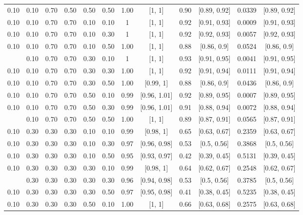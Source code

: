 \documentclass[
  11pt,
]{article}
\begin{document}
\begin{landscape}
\begin{ThreePartTable}
\begin{longtable}[t]{cccccccccccc}
0.10 & 0.10 & 0.70 & 0.50 & 0.50 & 0.50 & 1.00 & {}[1, 1] & 0.90 & {}[0.89, 0.92] & 0.0339 & {}[0.89, 0.92]\\
0.10 & 0.10 & 0.70 & 0.70 & 0.10 & 0.10 & 1 & {}[1, 1] & 0.92 & {}[0.91, 0.93] & 0.0009 & {}[0.91, 0.93]\\
0.10 & 0.10 & 0.70 & 0.70 & 0.10 & 0.30 & 1 & {}[1, 1] & 0.92 & {}[0.92, 0.93] & 0.0057 & {}[0.92, 0.93]\\
0.10 & 0.10 & 0.70 & 0.70 & 0.10 & 0.50 & 1.00 & {}[1, 1] & 0.88 & {}[0.86, 0.9] & 0.0524 & {}[0.86, 0.9]\\
\addlinespace
0.10 & 0.10 & 0.70 & 0.70 & 0.30 & 0.10 & 1 & {}[1, 1] & 0.93 & {}[0.91, 0.95] & 0.0041 & {}[0.91, 0.95]\\
0.10 & 0.10 & 0.70 & 0.70 & 0.30 & 0.30 & 1.00 & {}[1, 1] & 0.92 & {}[0.91, 0.94] & 0.0111 & {}[0.91, 0.94]\\
0.10 & 0.10 & 0.70 & 0.70 & 0.30 & 0.50 & 1.00 & {}[0.99, 1] & 0.88 & {}[0.86, 0.9] & 0.0436 & {}[0.86, 0.9]\\
0.10 & 0.10 & 0.70 & 0.70 & 0.50 & 0.10 & 0.99 & {}[0.96, 1.01] & 0.92 & {}[0.89, 0.95] & 0.0007 & {}[0.89, 0.95]\\
0.10 & 0.10 & 0.70 & 0.70 & 0.50 & 0.30 & 0.99 & {}[0.96, 1.01] & 0.91 & {}[0.88, 0.94] & 0.0072 & {}[0.88, 0.94]\\
\addlinespace
0.10 & 0.10 & 0.70 & 0.70 & 0.50 & 0.50 & 1.00 & {}[1, 1] & 0.89 & {}[0.87, 0.91] & 0.0565 & {}[0.87, 0.91]\\
0.10 & 0.30 & 0.30 & 0.30 & 0.10 & 0.10 & 0.99 & {}[0.98, 1] & 0.65 & {}[0.63, 0.67] & 0.2359 & {}[0.63, 0.67]\\
0.10 & 0.30 & 0.30 & 0.30 & 0.10 & 0.30 & 0.97 & {}[0.96, 0.98] & 0.53 & {}[0.5, 0.56] & 0.3868 & {}[0.5, 0.56]\\
0.10 & 0.30 & 0.30 & 0.30 & 0.10 & 0.50 & 0.95 & {}[0.93, 0.97] & 0.42 & {}[0.39, 0.45] & 0.5131 & {}[0.39, 0.45]\\
0.10 & 0.30 & 0.30 & 0.30 & 0.30 & 0.10 & 0.99 & {}[0.98, 1] & 0.64 & {}[0.62, 0.67] & 0.2548 & {}[0.62, 0.67]\\
\addlinespace
0.10 & 0.30 & 0.30 & 0.30 & 0.30 & 0.30 & 0.96 & {}[0.94, 0.98] & 0.53 & {}[0.5, 0.56] & 0.3785 & {}[0.5, 0.56]\\
0.10 & 0.30 & 0.30 & 0.30 & 0.30 & 0.50 & 0.97 & {}[0.95, 0.98] & 0.41 & {}[0.38, 0.45] & 0.5235 & {}[0.38, 0.45]\\
0.10 & 0.30 & 0.30 & 0.30 & 0.50 & 0.10 & 1.00 & {}[1, 1] & 0.66 & {}[0.63, 0.68] & 0.2575 & {}[0.63, 0.68]\\

\end{longtable}
\end{ThreePartTable}
\end{landscape}
\end{document}
